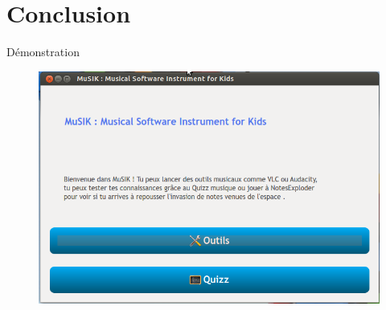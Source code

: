 \section{Conclusion}

\begin{frame}
\tableofcontents[currentsection]
\end{frame}

\begin{frame}{Démonstration}
  \begin{figure}[!h]
    \centering
    \includegraphics[height = 0.75\textheight]{./img/menu.png}
    \label{menu} 
  \end{figure}
\end{frame}
